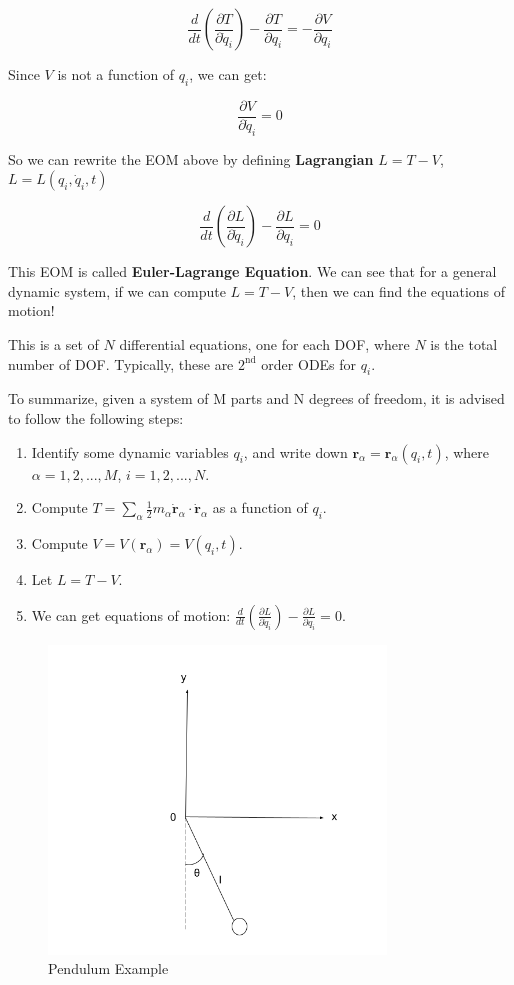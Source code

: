 \documentclass{article}
\theoremstyle{definition}
\theoremstyle{plain}
\theoremstyle{remark}
\begin{document}
\[
    \frac{d}{dt} (\frac{\partial T}{\partial \dot{q}_i}) - \frac{\partial T}{\partial q_i} = -\frac{\partial V}{\partial q_i}
\]

Since $V$ is not a function of $q_i$, we can get:

\[
    \frac{\partial V}{\partial \dot{q}_i}=0
\]

So we can rewrite the EOM above by defining \textbf{Lagrangian} $L=T-V$, $L=L(q_i, \dot{q}_i, t)$

\[
    \frac{d}{dt} (\frac{\partial L}{\partial \dot{q}_i}) - \frac{\partial L}{\partial q_i} = 0
\]

This EOM is called \textbf{Euler-Lagrange Equation}. We can see that for a general dynamic system, if we can compute $L=T-V$, then we can find the equations of motion!

This is a set of $N$ differential equations, one for each DOF, where $N$ is the total number of DOF. Typically, these are $2^{\text{nd}}$ order ODEs for $q_i$.

To summarize, given a system of M parts and N degrees of freedom, it is advised to follow the following steps:

\begin{enumerate}
    \item Identify some dynamic variables $q_i$, and write down $\mathbf{r}_\alpha=\mathbf{r}_\alpha(q_i, t)$, where $\alpha=1,2,...,M$, $i=1,2,...,N$.
    \item Compute $T=\sum_\alpha \frac{1}{2} m_\alpha \dot{\mathbf{r}}_\alpha \cdot \dot{\mathbf{r}}_\alpha$ as a function of $q_i$.
    \item Compute $V=V(\mathbf{r}_\alpha)=V(q_i, t)$.
    \item Let $L=T-V$.
    \item We can get equations of motion: $\frac{d}{dt} (\frac{\partial L}{\partial \dot{q}_i}) - \frac{\partial L}{\partial q_i} = 0$.
\end{enumerate}

\begin{figure}[h]
  \centering
  \includegraphics[width=0.8\textwidth]{images/2-1-1.png}
  \caption{Pendulum Example}
  \label{fig:2-1-1}
\end{figure}
\end{document}
